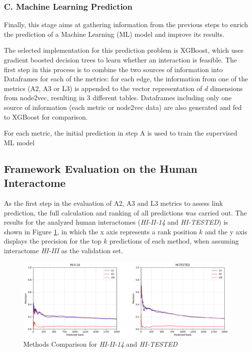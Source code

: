 \subsubsection*{C. Machine Learning Prediction}
Finally, this stage aims at gathering information from the previous steps to 
enrich the prediction of a Machine Learning (ML) model and improve its results. 

The selected implementation for this prediction problem is XGBoost, which 
uses gradient boosted decision trees to learn whether an interaction is feasible. 
The first step in this process is to combine the two sources of information into 
Dataframes for each of the metrics: for each edge, the information from one of the 
metrics (A2, A3 or L3) is appended to the vector representation of $d$ dimensions 
from node2vec, resulting in 3 different tables. Dataframes including only one 
source of information (each metric or node2vec data) are also generated and 
fed to XGBoost for comparison.

For each metric, the initial prediction in step A is used to train the supervised 
ML model 


\subsection*{Framework Evaluation on the Human Interactome}

As the first step in the evaluation of A2, A3 and L3 metrics to assess link
prediction, the full calculation and ranking of all predictions was
carried out. The results for the analyzed human interactomes (\emph{HI-II-14}
and \emph{HI-TESTED}) is shown in Figure \ref{fig:HI1}, in which
the x axis represents a rank position $k$ and the y axis displays
the precision for the top $k$ predictions of each method, when assuming
interactome \emph{HI-III} as the validation set. 
	
\begin{figure}[h]
\caption{\label{fig:HI1}Methods Comparison for \emph{HI-II-14} and \emph{HI-TESTED}}
	\includegraphics[width=\textwidth ]{figures/figure2.eps}
\end{figure}

